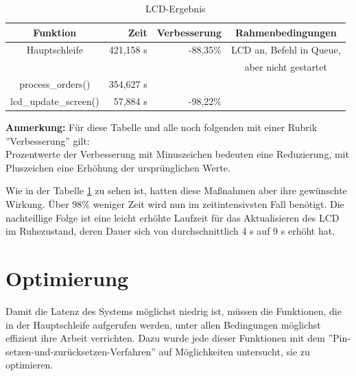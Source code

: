 \begin{table}[htb]
\begin{center}
	\begin{tabular}{|c||r|r|c|}
		\hline
		\textbf{Funktion} & \textbf{Zeit} & \textbf{Verbesserung} & \textbf{Rahmenbedingungen} \\ \hline \hline
		Hauptschleife & 421,158 \textmu{}s & -88,35\% & LCD an, Befehl in Queue,\\
		& & & aber nicht gestartet \\ \hline
		process\_orders() & 354,627 \textmu{}s & & \\ \hline
		lcd\_update\_screen() & 57,884 \textmu{}s & -98,22\% & \\ \hline
	\end{tabular}
	\caption{\label{lcd_opt} LCD-Ergebnis}
\end{center}
\textbf{Anmerkung:} Für diese Tabelle und alle noch folgenden mit einer Rubrik ''Verbesserung'' gilt:\\
Prozentwerte der Verbesserung mit Minuszeichen bedeuten eine Reduzierung, mit Pluszeichen eine Erhöhung
der ursprünglichen Werte.
\end{table}
Wie in der Tabelle \ref{lcd_opt} zu sehen ist, hatten diese Maßnahmen aber ihre gewünschte Wirkung. Über 98\% weniger Zeit
wird nun im zeitintensivsten Fall benötigt. Die nachteillige Folge ist eine leicht erhöhte Laufzeit für das
Aktualisieren des LCD im Ruhezustand, deren Dauer sich von durchschnittlich 4 \textmu{}s auf 9 \textmu{}s erhöht hat.

\section{Optimierung}
Damit die Latenz des Systems möglichst niedrig ist, müssen die Funktionen, die in der Hauptschleife aufgerufen werden,
unter allen Bedingungen möglichst effizient ihre Arbeit verrichten. Dazu wurde jede dieser Funktionen mit dem 
''Pin-setzen-und-zurücksetzen-Verfahren'' auf Möglichkeiten untersucht, sie zu optimieren.

